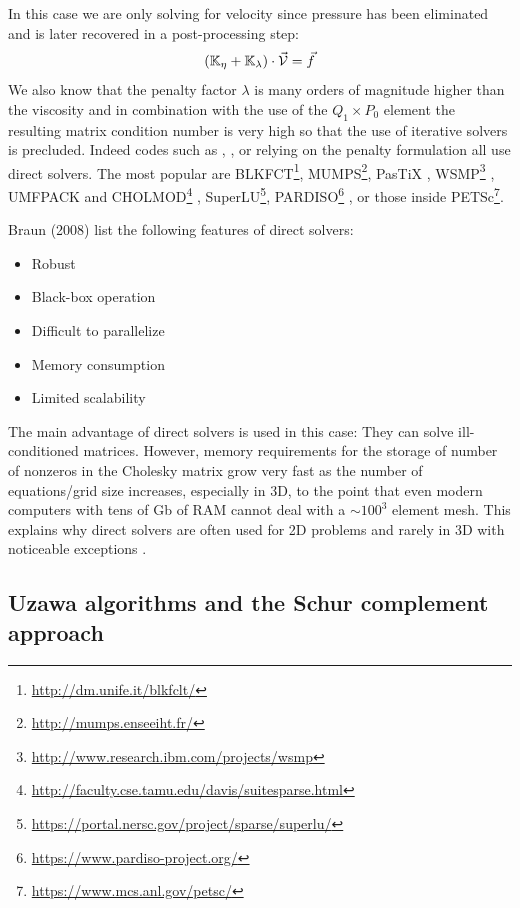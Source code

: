 In this case we are only solving for 
velocity since pressure has been eliminated and is later recovered in a post-processing step:
\[
({\mathbb{K}}_\eta+{\mathbb{K}}_\lambda) \cdot \vec {\cal V} = \vec f
\]
 We also know that 
the penalty factor $\lambda$ is many orders of magnitude higher than the viscosity and 
in combination with the use of the $Q_1 \times P_0$ element the resulting matrix 
condition number is very high so that the use of iterative solvers is precluded. 
Indeed codes such as \sopale \cite{full95}, \douar \cite{brtf08}, \fantom \cite{thie11} 
or \sulec \cite{qube11} relying on the penalty formulation all use direct solvers.
The most popular are BLKFCT\footnote{\url{http://dm.unife.it/blkfclt/}}, 
MUMPS\footnote{\url{http://mumps.enseeiht.fr/}}\cite{amdu89,amdl00,amdk01,amgl06,ambl19}, 
PasTiX \cite{herr02},
WSMP\footnote{\url{http://www.research.ibm.com/projects/wsmp}} \cite{GUPTA94ieee,GUPTA09sc-long},
UMFPACK and CHOLMOD\footnote{\url{http://faculty.cse.tamu.edu/davis/suitesparse.html}}
, SuperLU\footnote{\url{https://portal.nersc.gov/project/sparse/superlu/}}, 
PARDISO\footnote{\url{https://www.pardiso-project.org/}}
\cite{pardiso-6.0a,pardiso-6.0b,pardiso-6.0c}, or those inside 
PETSc\footnote{\url{https://www.mcs.anl.gov/petsc/}}.

Braun \etal (2008) \cite{brtf08} list the following features of direct solvers:
\begin{itemize}
\item Robust
\item Black-box operation
\item Difficult to parallelize
\item Memory consumption
\item Limited scalability
\end{itemize}

The main advantage of direct solvers is used in this case: They can solve ill-conditioned 
matrices. However, memory requirements for the storage of number of nonzeros in the 
Cholesky matrix grow very fast as the number of equations/grid size increases, especially in 3D,
to the point that even modern computers with tens of Gb of RAM cannot deal with a $\sim 100^3$ element mesh.
This explains why direct solvers are often used for 2D problems and rarely in 3D with noticeable 
exceptions \cite{thfb08,yahb09,brya10,lobh10,alht11,alht12,alhf13,whbb14,neew18}. 

\subsection{Uzawa algorithms and the Schur complement approach }

